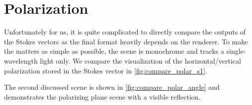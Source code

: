 \section{Polarization}

Unfortunately for us, it is quite complicated to directly compare the outputs of the Stokes vectors as the final format heavily depends on the renderer. To make the matters as simple as possible, the scene is monochrome and tracks a single-wavelength light only. We compare the visualization of the horizontal/vertical polarization stored in the Stokes vector in \autoref{fig:compare_polar_s1}. 

The second discussed scene is shown in \autoref{fig:compare_polar_angle} and demonstrates the polarizing plane scene with a visible reflection.

\renewcommand\thesubfigure{\arabic{subfigure}}
